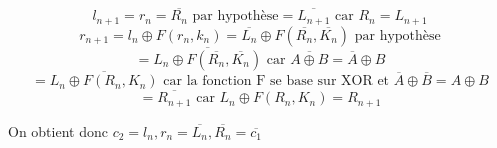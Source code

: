 \documentclass[fleqn]{article}
\begin{document}
\[l_{n+1} = r_n = \overline{R_n} \text{ par hypothèse} = \boxed{\overline{L_{n+1}}} \text{ car } R_n = L_{n+1}\] 
\[r_{n+1} = l_n \oplus F(r_n, k_n) = \overline{L_n} \oplus F(\overline{R_n}, \overline{K_n}) \text{ par hypothèse}\]
\[= \overline{L_n \oplus F(\overline{R_n}, \overline{K_n})} \text{ car } \overline{A \oplus B} = \overline{A} \oplus B\]
\[= \overline{L_n \oplus F(R_n, K_n)} \text{ car la fonction F se base sur XOR et } \overline{A} \oplus \overline{B} = A \oplus B\]
\[= \boxed{\overline{R_{n+1}}} \text{ car } L_n \oplus F(R_n, K_n) = R_{n+1}\]\newline

\noindent On obtient donc $\boxed{c_2 = l_n, r_n = \overline{L_n}, \overline{R_n} = \overline{c_1}}$
\section{\normalsize}
\end{document}
